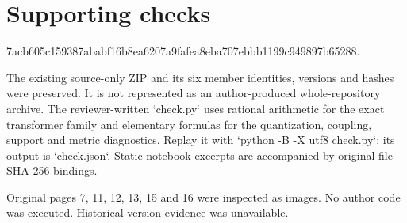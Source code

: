 \documentclass[10pt]{article}
\begin{document}
\section*{Supporting checks}
7acb605c159387ababf16b8ea6207a9fafea8eba707ebbb1199c949897b65288.\par
The existing source-only ZIP and its six member identities, versions and hashes were preserved. It is not represented as an author-produced whole-repository archive. The reviewer-written `check.py` uses rational arithmetic for the exact transformer family and elementary formulas for the quantization, coupling, support and metric diagnostics. Replay it with `python -B -X utf8 check.py`; its output is `check.json`. Static notebook excerpts are accompanied by original-file SHA-256 bindings.\par
Original pages 7, 11, 12, 13, 15 and 16 were inspected as images. No author code was executed. Historical-version evidence was unavailable.\par
\end{document}
